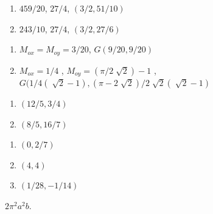 \documentclass[11pt]{amsbook}
\begin{document}
\begin{hEnumerateArabic}
    			\begin{enumerate}[label=\alph*)]
				\item $459/20$, $27/4$, $(3/2, 51/10)$
        			\item $243/10$, $27/4$, $(3/2, 27/6)$
    			\end{enumerate}
                \setcounter{enumi}{53}
                \item
            		\begin{enumerate}[label=\alph*)]
				\item $M_{ox} = M_{oy} = 3/20$, $G(9/20, 9/20)$
       			        \item $M_{ox} = 1/4$ , $M_{oy} = (\pi/2 \sqrt[]{2})-1$ , $G(1/4(\sqrt[]{2}-1), (\pi-2 \sqrt[]{2})/2 \sqrt[]{2}( 											\sqrt[]{2}-1)$
    			\end{enumerate}	
               \setcounter{enumi}{55}
               \item
            		\begin{enumerate}[label=\alph*)]
				\item $(12/5 , 3/4)$
                        	\item $(8/5 , 16/7)$
    			\end{enumerate}
               \setcounter{enumi}{57}
               \item 
            		\begin{enumerate}[label=\alph*)]
				\item $(0 , 2/7)$
                  	        \item $(4 , 4)$
                   	        \item $(1/28 , -1/14)$
    			\end{enumerate}
              \setcounter{enumi}{59}
              \item $2\pi^2a^2b$. 
    \end{hEnumerateArabic}
\end{document}
